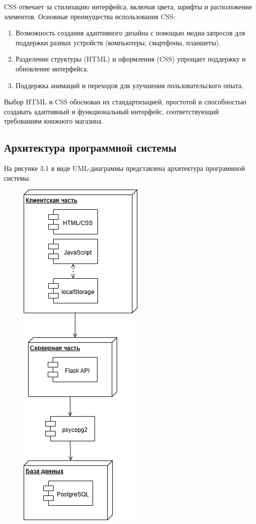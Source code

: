 CSS отвечает за стилизацию интерфейса, включая цвета, шрифты и расположение элементов.
Основные преимущества использования CSS:
\begin{enumerate}
	\item Возможность создания адаптивного дизайна с помощью медиа-запросов для поддержки разных устройств (компьютеры, смартфоны, планшеты).
	\item Разделение структуры (HTML) и оформления (CSS) упрощает поддержку и обновление интерфейса.
	\item Поддержка анимаций и переходов для улучшения пользовательского опыта.
\end{enumerate}


Выбор HTML и CSS обоснован их стандартизацией, простотой и способностью создавать адаптивный и функциональный интерфейс, соответствующий требованиям книжного магазина.


\subsection{Архитектура программной системы}

 На рисунке 3.1 в виде UML-диаграммы представлена архитектура
программной системы.

\begin{figure}[H]
	\centering
	\includegraphics[width=0.3\linewidth]{images/диаграмма_компонентов}
	\caption{}
	\label{fig:}
\end{figure}


